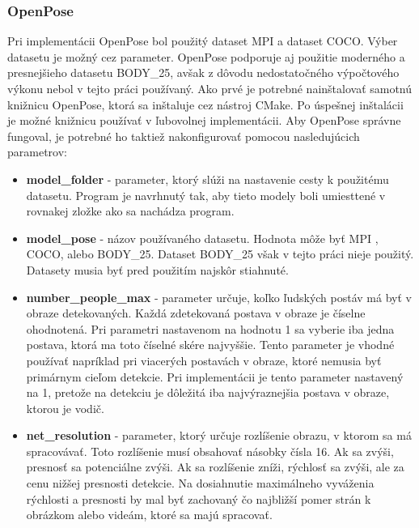 \documentclass[slovak,master,dept460,male,cpp,cpdeclaration]{diploma}
\begin{document}
\subsubsection*{OpenPose}
 Pri implementácii OpenPose bol použitý dataset MPI a dataset COCO. Výber datasetu je možný cez parameter. OpenPose podporuje aj použitie moderného a presnejšieho datasetu BODY\_25, avšak z dôvodu nedostatočného výpočtového výkonu nebol v tejto práci používaný. Ako prvé je potrebné nainštalovať samotnú knižnicu OpenPose, ktorá sa inštaluje cez  nástroj CMake. Po úspešnej inštalácii je možné  knižnicu používať v ľubovolnej  implementácii. Aby OpenPose správne fungoval, je potrebné ho taktiež nakonfigurovať pomocou nasledujúcich parametrov:
 \begin{itemize}
\item \textbf{model\_folder} - parameter, ktorý slúži na nastavenie cesty k použitému  datasetu. Program je navrhnutý tak, aby  tieto modely boli umiesttené v rovnakej zložke ako sa nachádza program. 
\item \textbf{model\_pose} - názov používaného datasetu. Hodnota môže  byť MPI , COCO, alebo BODY\_25. Dataset  BODY\_25 však v tejto práci nieje použitý. Datasety musia byť pred použitím najskôr stiahnuté.
\item \textbf{number\_people\_max} - parameter určuje, koľko ľudských postáv má byť v obraze detekovaných. Každá zdetekovaná postava v obraze je číselne ohodnotená. Pri parametri nastavenom na hodnotu 1 sa vyberie iba jedna postava, ktorá ma toto číselné skére najvyššie. Tento parameter je vhodné používať napríklad pri viacerých postavách v obraze, ktoré nemusia byť primárnym cieľom detekcie. Pri implementácii je tento parameter nastavený na 1, pretože na detekciu je dôležitá iba najvýraznejšia postava v obraze, ktorou je vodič.
\item \textbf{net\_resolution} - parameter, ktorý určuje rozlíšenie  obrazu, v ktorom sa má spracovávať. Toto rozlíšenie  musí obsahovať násobky čísla 16. Ak sa zvýši, presnosť sa potenciálne zvýši. Ak sa rozlíšenie zníži, rýchlosť sa zvýši, ale za cenu nižšej presnosti detekcie.  Na dosiahnutie maximálneho vyváženia rýchlosti a presnosti by mal byť zachovaný čo najbližší pomer strán k obrázkom alebo videám, ktoré sa majú spracovať.
\end{itemize}
\end{document}
